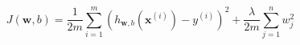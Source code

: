 \documentclass{article}
\begin{document}
$$
J(\mathbf{w}, b) = \frac{1}{2m} \sum_{i=1}^{m} \left( h_{\mathbf{w}, b}(\mathbf{x}^{(i)}) - y^{(i)} \right)^2 + \frac{\lambda}{2m} \sum_{j=1}^{n} w_j^2
$$
\end{document}
